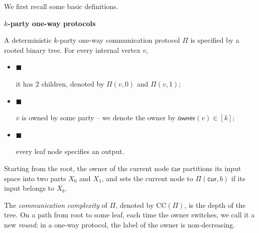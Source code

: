 \documentclass[10pt,a4paper]{article}
\begin{document}
We first recall some basic definitions.\par




\par\medskip\noindent\textbf{
$k$-party one-way protocols}\par




A deterministic $k$-party one-way communication protocol $\Pi$ is specified by a rooted binary tree.
For every internal vertex $v$,\par


\begin{itemize}


\item[] 
$\blacksquare$ 


it has 2 children, denoted by $\Pi(v,0)$ and $\Pi(v,1)$;\par





\item[] 
$\blacksquare$ 


$v$ is owned by some party – we denote the owner by $\mathsf{owner}(v)\in[k]$;\par





\item[] 
$\blacksquare$ 


every leaf node specifies an output.\par





\end{itemize}


Starting from the root,
the owner of the current node $\mathsf{cur}$ partitions its input space into two parts $X_{0}$ and $X_{1}$, and sets the current node to $\Pi(\mathsf{cur},b)$ if its input belongs to $X_{b}$.\par




The \emph{communication complexity} of $\Pi$, denoted by $\mathrm{CC}(\Pi)$, is the depth of the tree.
On a path from root to some leaf, each time the owner switches, we call it a new \emph{round}; in a one-way protocol, the label of the owner is non-decreasing.\par



\end{document}
